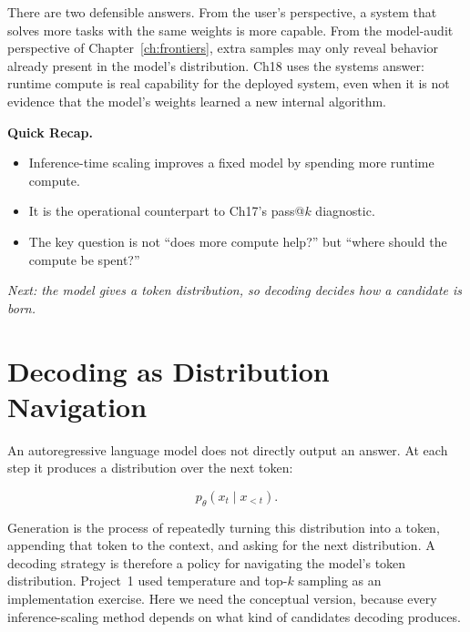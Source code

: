 \begin{tcolorbox}[colback=blue!5, colframe=blue!40, title=\textbf{Is Inference-Time Scaling Real Capability?}]
There are two defensible answers. From the user's perspective, a system that solves more tasks with the same weights is more capable. From the model-audit perspective of Chapter~\ref{ch:frontiers}, extra samples may only reveal behavior already present in the model's distribution. Ch18 uses the systems answer: runtime compute is real capability for the deployed system, even when it is not evidence that the model's weights learned a new internal algorithm.
\end{tcolorbox}

\begin{quickrecap}
\textbf{Quick Recap.}
\begin{itemize}[nosep,leftmargin=1.5em]
  \item Inference-time scaling improves a fixed model by spending more runtime compute.
  \item It is the operational counterpart to Ch17's pass@$k$ diagnostic.
  \item The key question is not ``does more compute help?'' but ``where should the compute be spent?''
\end{itemize}
\textit{Next: the model gives a token distribution, so decoding decides how a candidate is born.}
\end{quickrecap}


\section{Decoding as Distribution Navigation}
\label{sec:ch18-decoding}

An autoregressive language model does not directly output an answer. At each step it produces a distribution over the next token:

\begin{equation}
  p_\theta(x_t \mid x_{<t}).
  \label{eq:next-token-distribution}
\end{equation}

Generation is the process of repeatedly turning this distribution into a token, appending that token to the context, and asking for the next distribution. A decoding strategy is therefore a policy for navigating the model's token distribution. Project~1 used temperature and top-$k$ sampling as an implementation exercise. Here we need the conceptual version, because every inference-scaling method depends on what kind of candidates decoding produces.


